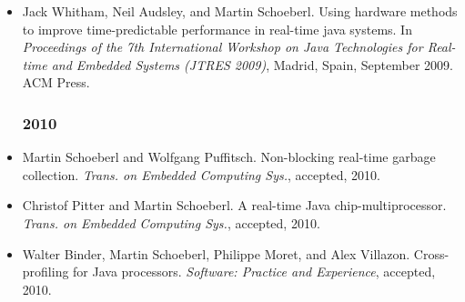 \begin{itemize}
\item Jack Whitham, Neil Audsley, and Martin Schoeberl. Using
    hardware methods to improve time-predictable performance in
  real-time java systems. In {\em Proceedings of the 7th
International Workshop on Java
  Technologies for Real-time and Embedded Systems (JTRES 2009)},
  Madrid, Spain, September 2009. ACM Press.


\subsubsection*{2010}

\item Martin Schoeberl and Wolfgang Puffitsch. Non-blocking
    real-time garbage collection. {\em Trans. on Embedded
    Computing Sys.}, accepted, 2010.

\item Christof Pitter and Martin Schoeberl. A real-time {Java}
    chip-multiprocessor. {\em Trans. on Embedded Computing Sys.},
    accepted, 2010.

\item Walter Binder, Martin Schoeberl, Philippe Moret, and Alex
    Villazon. Cross-profiling for Java processors. {\em Software:
Practice and Experience}, accepted, 2010.

\end{itemize}

